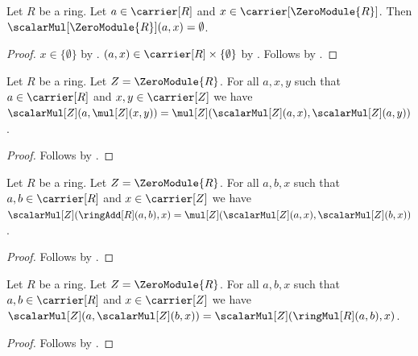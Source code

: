 \begin{proposition}\label{zero_module_scalar}
    Let $R$ be a ring.
    Let $a\in\carrier[R]$ and $x\in\carrier[\ZeroModule{R}]$.
    Then $\scalarMul[\ZeroModule{R}](a,x)=\emptyset$.
\end{proposition}
\begin{proof}
    $x\in\{\emptyset\}$ by .
    $(a,x)\in\carrier[R]\times\{\emptyset\}$ by
        .
    Follows by .
\end{proof}

\begin{proposition}\label{zero_module_scalar_vector_distributive}
    Let $R$ be a ring.
    Let $Z=\ZeroModule{R}$.
    For all $a,x,y$ such that $a\in\carrier[R]$ and
        $x,y\in\carrier[Z]$ we have
        $\scalarMul[Z](a,\mul[Z](x,y))
            =\mul[Z](\scalarMul[Z](a,x),\scalarMul[Z](a,y))$.
\end{proposition}
\begin{proof}
    Follows by
        .
\end{proof}

\begin{proposition}\label{zero_module_scalar_add_distributive}
    Let $R$ be a ring.
    Let $Z=\ZeroModule{R}$.
    For all $a,b,x$ such that $a,b\in\carrier[R]$ and
        $x\in\carrier[Z]$ we have
        $\scalarMul[Z](\ringAdd[R](a,b),x)
            =\mul[Z](\scalarMul[Z](a,x),\scalarMul[Z](b,x))$.
\end{proposition}
\begin{proof}
    Follows by
        .
\end{proof}

\begin{proposition}\label{zero_module_scalar_associative}
    Let $R$ be a ring.
    Let $Z=\ZeroModule{R}$.
    For all $a,b,x$ such that $a,b\in\carrier[R]$ and
        $x\in\carrier[Z]$ we have
        $\scalarMul[Z](a,\scalarMul[Z](b,x))
            =\scalarMul[Z](\ringMul[R](a,b),x)$.
\end{proposition}
\begin{proof}
    Follows by
        .
\end{proof}

